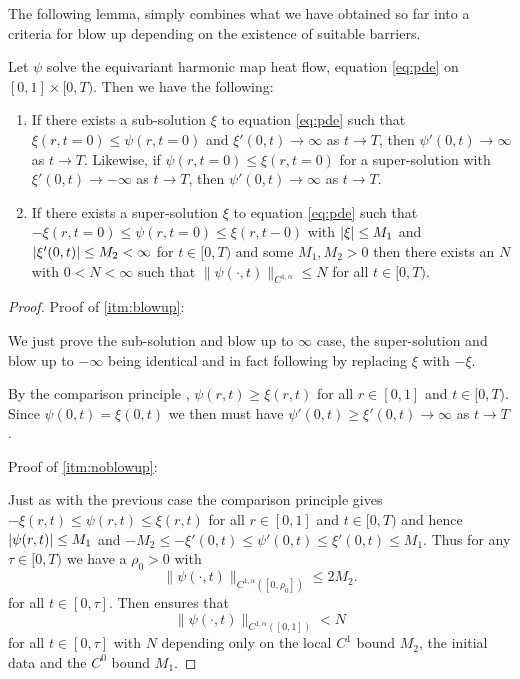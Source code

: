 \documentclass{amsart}
\begin{document}
The following lemma, simply combines what we have obtained so far into a criteria for blow up depending on the existence of suitable barriers.

\begin{lemma}
\label{lem:blowup_criteria}
Let \(\psi\) solve the equivariant harmonic map heat flow, equation \eqref{eq:pde} on \([0, 1] \times [0, T)\). Then  we have the following:

\begin{enumerate}
\item If there exists a sub-solution \(\xi\) to equation \eqref{eq:pde} such that \(\xi(r, t=0) \leq \psi(r, t=0)\) and \(\xi'(0, t) \to \infty\) as \(t \to T\), then \(\psi'(0, t) \to \infty\) as \(t \to T\). Likewise, if \(\psi(r, t = 0) \leq \xi(r, t=0)\) for a super-solution with \(\xi'(0, t) \to -\infty\) as \(t \to T\), then \(\psi'(0, t) \to \infty\) as \(t \to T\). \label{itm:blowup}
\item If there exists a super-solution \(\xi\) to equation \eqref{eq:pde} such that \(-\xi(r, t=0) \leq \psi(r, t=0) \leq \xi(r, t-0)\) with \(\left|{\xi}\right| \leq M_1\) and \(\left|{\xi'(0, t)}\right| \leq M_2 < \infty\) for \(t \in [0, T)\) and some \(M_1, M_2 > 0\) then there exists an \(N\) with \(0 < N < \infty\) such that \(\|\psi(\cdot, t)\|_{C^{1,\alpha}} \leq N\) for all \(t \in [0, T)\). \label{itm:noblowup}
\end{enumerate}
\end{lemma}

\begin{proof}
Proof of \ref{itm:blowup}:

We just prove the sub-solution and blow up to \(\infty\) case, the super-solution and blow up to \(-\infty\) being identical and in fact following by replacing \(\xi\) with \(-\xi\).

By the comparison principle , \(\psi(r, t) \geq \xi(r, t)\) for all \(r \in [0, 1]\) and \(t \in [0, T)\). Since \(\psi(0, t) = \xi(0, t)\) we then must have \(\psi'(0, t) \geq \xi'(0, t) \to \infty\) as \(t \to T\).

Proof of \ref{itm:noblowup}:

Just as with the previous case the comparison principle  gives \(-\xi(r, t) \leq \psi(r, t) \leq \xi(r, t)\) for all \(r \in [0, 1]\) and \(t \in [0, T)\) and hence \(\left|{\psi(r, t)}\right| \leq M_1\) and \(-M_2 \leq -\xi'(0, t) \leq \psi'(0, t) \leq \xi'(0, t) \leq M_1\). Thus for any \(\tau \in [0, T)\) we have a \(\rho_0 > 0\) with
\[
\|\psi(\cdot, t)\|_{C^{1,\alpha}([0, \rho_0])} \leq 2M_2.
\]
for all \(t \in [0, \tau]\). Then  ensures that
\[
\|\psi(\cdot, t)\|_{C^{1,\alpha}([0, 1])} < N
\]
for all \(t \in [0, \tau]\) with \(N\) depending only on the local \(C^1\) bound \(M_2\), the initial data and the \(C^0\) bound \(M_1\).
\end{proof}
\end{document}

